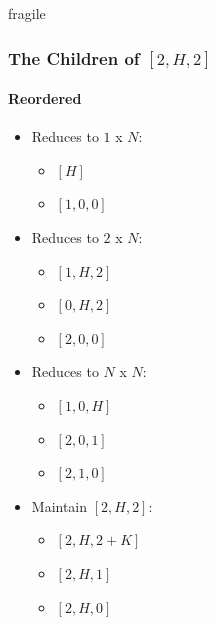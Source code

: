 \documentclass[aspectratio=169,usenames,dvipsnames]{beamer}
\begin{document}
\begin{frame}{fragile}
    \frametitle{The Children of $[2, H, 2]$}
    \framesubtitle{Reordered}
    
    \begin{multicols}{2}
    \begin{itemize}
        \item Reduces to $1$ x $N$:
        \begin{itemize}
            \item $[H]$
            \item $[1, 0, 0]$
        \end{itemize}
    \end{itemize}
    \text{$  $} %
    
    \begin{itemize}
        \item Reduces to $2$ x $N$:
        \begin{itemize}
            \item $[1, H, 2]$
            \item $[0, H, 2]$
            \item $[2, 0, 0]$
        \end{itemize}
    \end{itemize}
    
    \begin{itemize}
        \item Reduces to $N$ x $N$:
        \begin{itemize}
            \item $[1, 0, H]$
            \item $[2, 0, 1]$
            \item $[2, 1, 0]$
        \end{itemize}
    \end{itemize}
    
    \begin{itemize}
        \item Maintain $[2, H, 2]$:
        \begin{itemize}
            \item $[2, H, 2 + K]$
            \item $[2, H, 1]$
            \item $[2, H, 0]$
        \end{itemize}
    \end{itemize}
    \end{multicols}
    
\end{frame}
\end{document}
